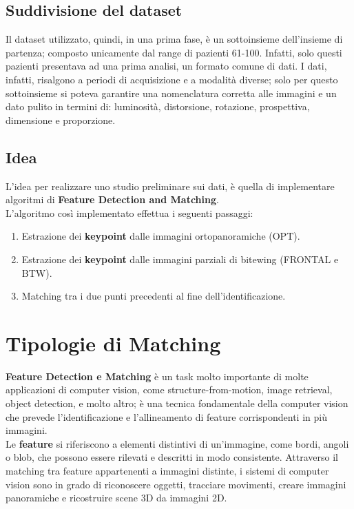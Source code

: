\documentclass[12pt,a4paper,openright,twoside]{book}
\begin{document}
\subsection{Suddivisione del dataset}
Il dataset utilizzato, quindi, in una prima fase, è un sottoinsieme dell'insieme di partenza; composto unicamente dal range di pazienti 61-100. Infatti, solo questi pazienti presentava ad una prima analisi, un formato comune di dati. I dati, infatti, risalgono a periodi di acquisizione e a modalità diverse; solo per questo sottoinsieme si poteva garantire una nomenclatura corretta alle immagini e un dato pulito in termini di: luminosità, distorsione, rotazione, prospettiva, dimensione e proporzione.

\subsection{Idea}
L'idea per realizzare uno studio preliminare sui dati, è quella di implementare algoritmi di \textbf{Feature Detection and Matching}.\\
L'algoritmo così implementato effettua i seguenti passaggi:
\begin{enumerate}
\item Estrazione dei \textbf{keypoint} dalle immagini ortopanoramiche (OPT).
\item Estrazione dei \textbf{keypoint} dalle immagini parziali di bitewing (FRONTAL e BTW).
\item Matching tra i due punti precedenti al fine dell'identificazione.
\end{enumerate}

\section{Tipologie di Matching}
\textbf{Feature Detection e Matching} è un task molto importante di molte applicazioni di computer vision, come structure-from-motion, image retrieval, object detection, e molto altro; è una tecnica fondamentale della computer vision che prevede l'identificazione e l'allineamento di feature corrispondenti in più immagini.\\
Le \textbf{feature} si riferiscono a elementi distintivi di un'immagine, come bordi, angoli o blob, che possono essere rilevati e descritti in modo consistente. Attraverso il matching tra feature appartenenti a immagini distinte, i sistemi di computer vision sono in grado di riconoscere oggetti, tracciare movimenti, creare immagini panoramiche e ricostruire scene 3D da immagini 2D.\\
\end{document}

